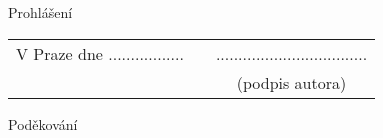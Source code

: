 \newcommand{\odsaditodzhora}{\hskip1pt\vfill}

\odsaditodzhora
\noindent Prohlášení



\begin{flushleft}
\begin{tabular}{cp{}c}
V Praze dne .................
& 
&
..................................
\\
&&
(podpis autora)
\end{tabular}

\end{flushleft}
\newpage

\odsaditodzhora
\noindent Poděkování


\newpage
